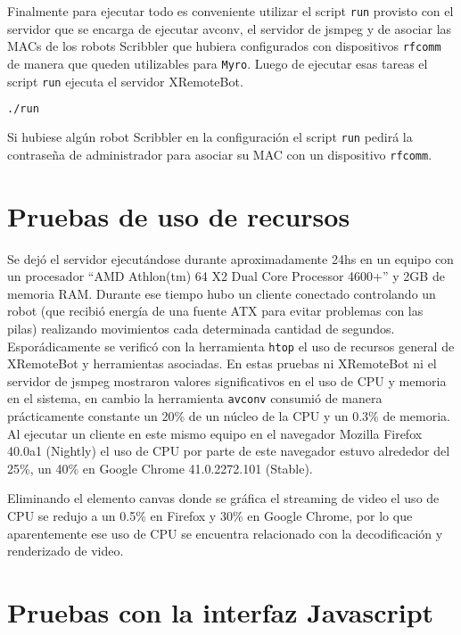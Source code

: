 Finalmente para ejecutar todo es conveniente utilizar el script
\texttt{run} provisto con el servidor que se encarga de ejecutar
avconv, el servidor de jsmpeg y de asociar las MACs de los
robots Scribbler que hubiera configurados con dispositivos
\texttt{rfcomm} de manera que queden utilizables para \texttt{Myro}.
Luego de ejecutar esas tareas el script \texttt{run} ejecuta
el servidor XRemoteBot.

\begin{lstlisting}[language=bash,
caption={Ejecutar el servidor y procesos asociados},
label=lst:ejecutar_xremotebot]
./run
\end{lstlisting}

Si hubiese algún robot Scribbler en la configuración el script
\texttt{run} pedirá la contraseña de administrador para asociar
su MAC con un dispositivo \texttt{rfcomm}.

\section{Pruebas de uso de recursos}
Se dejó el servidor ejecutándose durante aproximadamente 24hs en
un equipo con un procesador
``AMD Athlon(tm) 64 X2 Dual Core Processor 4600+'' y 2GB de memoria
RAM. Durante ese tiempo hubo un cliente conectado controlando
un robot (que recibió energía de una fuente ATX para evitar problemas
con las pilas) realizando movimientos cada determinada cantidad de
segundos. Esporádicamente se verificó con la herramienta
\texttt{htop} el uso de recursos general de XRemoteBot y herramientas
asociadas. En estas pruebas ni XRemoteBot ni el servidor de jsmpeg
mostraron valores significativos en el uso de CPU y memoria en
el sistema, en cambio la herramienta \texttt{avconv} consumió
de manera prácticamente constante un 20\% de un núcleo de la CPU
y un 0.3\% de memoria. Al ejecutar un cliente en este mismo
equipo en el navegador Mozilla Firefox 40.0a1 (Nightly)
el uso de CPU por parte de este navegador estuvo alrededor
del 25\%, un 40\% en Google Chrome 41.0.2272.101 (Stable).

Eliminando el elemento canvas donde se gráfica el streaming de video
el uso de CPU se redujo a un 0.5\% en Firefox y 30\% en Google Chrome,
por lo que aparentemente ese uso de CPU se encuentra relacionado
con la decodificación y renderizado de video.

\section{Pruebas con la interfaz Javascript}

